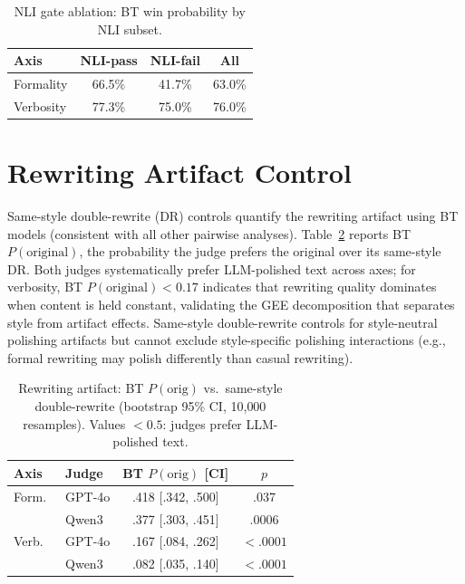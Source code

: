 \begin{table}[h]
\centering
\small
\caption{NLI gate ablation: BT win probability by NLI subset.}
\label{tab:nli_ablation}
\begin{tabular}{lccc}
\toprule
Axis & NLI-pass & NLI-fail & All \\
\midrule
Formality & 66.5\% & 41.7\% & 63.0\% \\
Verbosity & 77.3\% & 75.0\% & 76.0\% \\
\bottomrule
\end{tabular}
\end{table}

\section{Rewriting Artifact Control}
\label{app:artifact_control}

Same-style double-rewrite (DR) controls quantify the rewriting artifact using BT models (consistent with all other pairwise analyses).
Table~\ref{tab:artifact} reports BT $P(\text{original})$, the probability the judge prefers the original over its same-style DR.
Both judges systematically prefer LLM-polished text across axes; for verbosity, BT $P(\text{original}) < 0.17$ indicates that rewriting quality dominates when content is held constant, validating the GEE decomposition that separates style from artifact effects.
Same-style double-rewrite controls for style-neutral polishing artifacts but cannot exclude style-specific polishing interactions (e.g., formal rewriting may polish differently than casual rewriting).

\begin{table}[h]
\centering
\small
\caption{Rewriting artifact: BT $P(\text{orig})$ vs.\ same-style double-rewrite (bootstrap 95\% CI, 10{,}000 resamples). Values ${<}0.5$: judges prefer LLM-polished text.}
\label{tab:artifact}
\begin{tabular}{@{}llcc@{}}
\toprule
Axis & Judge & BT $P(\text{orig})$ [CI] & $p$ \\
\midrule
Form.\ & GPT-4o & .418 [.342, .500] & .037 \\
 & Qwen3 & .377 [.303, .451] & .0006 \\
\midrule
Verb.\ & GPT-4o & .167 [.084, .262] & ${<}.0001$ \\
 & Qwen3 & .082 [.035, .140] & ${<}.0001$ \\
\bottomrule
\end{tabular}
\end{table}

